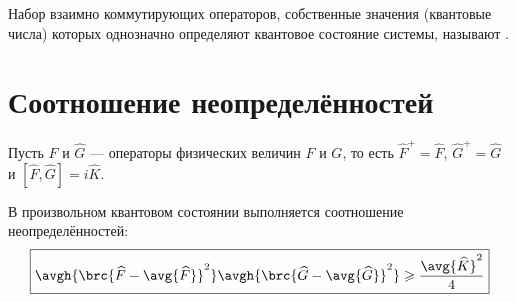 \begin{defn}
Набор взаимно коммутирующих операторов, собственные значения (квантовые числа) которых однозначно определяют квантовое состояние системы, называют .
\end{defn}

\section{Соотношение неопределённостей}

Пусть $\widehat{F}$ и $\widehat{G}$ --- операторы физических величин $F$ и $G$, то есть $\widehat{F}^+=\widehat{F}$, $\widehat{G}^+=\widehat{G}$ и $[\widehat{F},\widehat{G}]=i\widehat{K}$.

\begin{thm}
В произвольном квантовом состоянии выполняется соотношение неопределённостей:
$$\boxed{\avgh{\brc{\widehat{F}-\avg{\widehat{F}}}^2} \avgh{\brc{\widehat{G}-\avg{\widehat{G}}}^2} \geqslant \frac{\avg{\widehat{K}}^2}{4}}$$
\end{thm}

